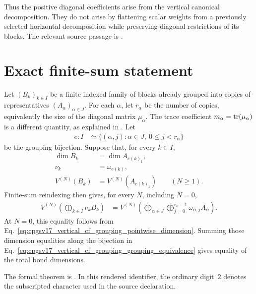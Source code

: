 \documentclass{article}
\begin{document}
Thus the positive diagonal coefficients arise from the vertical canonical
decomposition. They do not arise by flattening scalar weights from a
previously selected horizontal decomposition while preserving diagonal
restrictions of its blocks. The relevant source passage is
.

\section{Exact finite-sum statement}

Let $(B_k)_{k\in I}$ be a finite indexed family of blocks already grouped into
copies of representatives $(A_\alpha)_{\alpha\in J}$. For each $\alpha$, let
$r_\alpha$ be the number of copies, equivalently the size of the diagonal
matrix $\mu_\alpha$. The trace coefficient
$m_\alpha=\operatorname{tr}(\mu_\alpha)$ is a different quantity, as explained in
. Let
\begin{align}
    e:I
     & \simeq
    \{(\alpha,j):\alpha\in J,\ 0\leq j<r_\alpha\}
    \label{eq:cpgsv17_vertical_cf_grouping_grouping_equivalence}
\end{align}
be the grouping bijection. Suppose that, for every $k\in I$,
\begin{align}
    \dim B_k
     & =\dim A_{e(k)_1},
    \label{eq:cpgsv17_vertical_cf_grouping_pointwise_dimension} \\
    \nu_k
     & =\omega_{e(k)},
    \label{eq:cpgsv17_vertical_cf_grouping_pointwise_weight}    \\
    V^{(N)}(B_k)
     & =V^{(N)}(A_{e(k)_1})
    \qquad (N\geq1).
    \label{eq:cpgsv17_vertical_cf_grouping_pointwise_mpv}
\end{align}
Finite-sum reindexing then gives, for every $N$, including $N=0$,
\begin{align}
    V^{(N)}\!\left(\bigoplus_{k\in I}\nu_kB_k\right)
     & =
    V^{(N)}\!\left(\bigoplus_{\alpha\in J}
    \bigoplus_{j=0}^{r_\alpha-1}
    \omega_{\alpha,j}A_\alpha\right).
    \label{eq:cpgsv17_vertical_cf_grouping_regrouped_mpv}
\end{align}
At $N=0$, this equality follows from
Eq.~\ref{eq:cpgsv17_vertical_cf_grouping_pointwise_dimension}. Summing those
dimension equalities along the bijection in
Eq.~\ref{eq:cpgsv17_vertical_cf_grouping_grouping_equivalence} gives equality
of the total bond dimensions.

The formal theorem is
.
In this rendered identifier, the ordinary digit~$2$ denotes the subscripted
character used in the source declaration.
\end{document}
